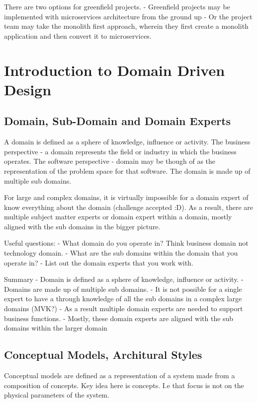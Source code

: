 There are two options for greenfield projects.
- Greenfield projects may be implemented with microservices architecture from the ground up
- Or the project team may take the monolith first approach, wherein they first create a monolith application and then convert it to microservices.

\chapter{Introduction to Domain Driven Design}

\section{Domain, Sub-Domain and Domain Experts}
A domain is defined as a sphere of knowledge, influence or activity.
The business perspective - a domain represents the field or industry in which the business operates.
The software perspective - domain may be though of as the representation of the problem space for that software. The domain is made up of multiple sub domains.

For large and complex domains, it is virtually impossible for a domain expert of know everything about the domain (challenge accepted :D).
As a result, there are multiple subject matter experts or domain expert within a domain, mostly aligned with the sub domains in the bigger picture.

Useful questions:
- What domain do you operate in? Think business domain not technology domain.
- What are the sub domains within the domain that you operate in?
- List out the domain experts that you work with.

Summary
- Domain is defined as a sphere of knowledge, influence or activity.
- Domains are made up of multiple sub domains.
    - It is not possible for a single expert to have a through knowledge of all the sub domains in a complex large domains (MVK?)
    - As a result multiple domain experts are needed to support business functions.
    - Mostly, these domain experts are aligned with the sub domains within the larger domain

\section{Conceptual Models, Architural Styles}
Conceptual models are defined as a representation of a system made from a composition of concepts. Key idea here is concepts.
I.e that focus is not on the physical parameters of the system.

